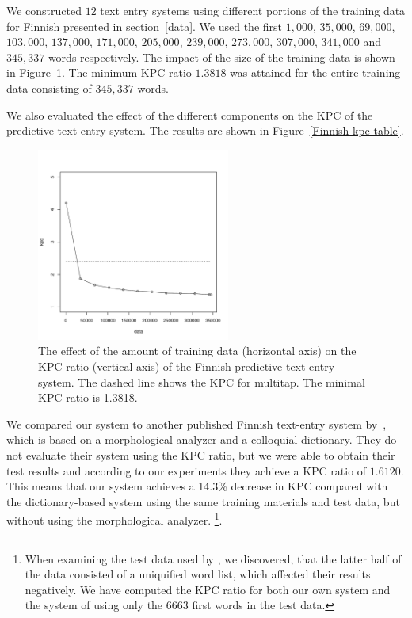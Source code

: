 \documentclass{llncs}
\begin{document}
We constructed $12$ text entry systems using different portions of the
training data for Finnish presented in section~\ref{data}. We used the
first $1,000$, $35,000$, $69,000$, $103,000$, $137,000$, $171,000$,
$205,000$, $239,000$, $273,000$, $307,000$, $341,000$ and $345,337$ words
respectively. The impact of the size of the training data is shown in
Figure~\ref{fi-kpc-graph}. The minimum KPC ratio $1.3818$ was attained
for the entire training data consisting of $345,337$ words.

We also evaluated the effect of the different components on the KPC of
the predictive text entry system. The results are shown in
Figure~\ref{Finnish-kpc-table}.

\begin{figure}[hbt!]
\begin{center}
\includegraphics[width=2.5in]{finnish_kpc_figure.pdf}
\end{center}
\caption{The effect of the amount of training data (horizontal axis)
  on the KPC ratio (vertical axis) of the Finnish predictive text
  entry system. The dashed line shows the KPC for
  multitap. The minimal KPC ratio is 1.3818.}\label{fi-kpc-graph}
\end{figure}

We compared our system to another published Finnish text-entry system
by~\cite{silfverberg/2011/cla}, which is based on a morphological
analyzer and a colloquial dictionary. They do not evaluate their
system using the KPC ratio, but we were able to obtain their test
results and according to our experiments they achieve a KPC ratio of
$1.6120$. This means that our system achieves a 14.3\% decrease in KPC
compared with the dictionary-based system using the same training
materials and test data, but without using the morphological
analyzer. \footnote{When examining the test data used by
  \cite{silfverberg/2011/cla}, we discovered, that the latter half of
  the data consisted of a uniquified word list, which affected their
  results negatively. We have computed the KPC ratio for both our own
  system and the system of \cite{silfverberg/2011/cla} using only the
  $6663$ first words in the test data.}.
\end{document}
